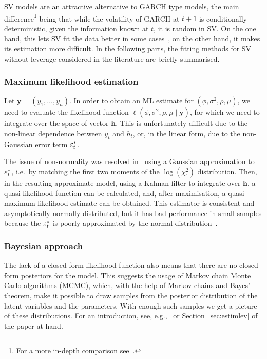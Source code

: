 SV models are an attractive alternative to GARCH type models, the main difference\footnote{For a more in-depth comparison see~\citet{Harvey1994}.} being that while the volatility of GARCH at $t+1$ is conditionally deterministic, given the information known at $t$, it is random in SV.
On the one hand, this lets SV fit the data better in some cases~\citep{Kim1998,kastner2016dealing,Chan2016}, on the other hand, it makes its estimation more difficult. In the following parts, the fitting methods for SV without leverage considered in the literature are briefly summarised.

\subsubsection{Maximum likelihood estimation}

Let $\bm{y}=(y_1,\dots,y_n)$.
In order to obtain an ML estimate for $(\phi,\sigma^2,\rho,\mu)$, we need to evaluate the likelihood function $\ell(\phi,\sigma^2,\rho,\mu\mid\bm{y})$, for which we need to integrate over the space of vector $\bm{h}$.
This is unfortunately difficult due to the non-linear dependence between $y_t$ and $h_t$, or, in the linear form, due to the non-Gaussian error term $\varepsilon_t^\ast$.

The issue of non-normality was resolved in~\citet{Harvey1994} using a Gaussian approximation to $\varepsilon_t^\ast$, i.e.\ by matching the first two moments of the $\log(\chi_1^2)$ distribution.
Then, in the resulting approximate model, using a Kalman filter to integrate over $\bm{h}$, a quasi-likelihood function can be calculated, and, after maximisation, a quasi-maximum likelihood estimate can be obtained.
This estimator is consistent and asymptotically normally distributed, but it has bad performance in small samples because the $\varepsilon_t^\ast$ is poorly approximated by the normal distribution~\citep{Kim1998}.

\subsubsection{Bayesian approach}

The lack of a closed form likelihood function also means that there are no closed form posteriors for the model.
This suggests the usage of Markov chain Monte Carlo algorithms (MCMC), which, with the help of Markov chains and Bayes' theorem, make it possible to draw samples from the posterior distribution of the latent variables and the parameters.
With enough such samples we get a picture of these distributions.
For an introduction, see, e.g.,~\citet{Geyer2011} or Section~\ref{sec:estimlev} of the paper at hand.

